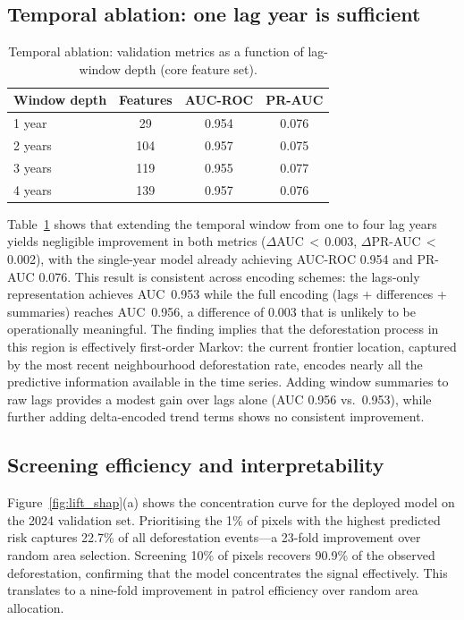 \documentclass{iopart}
\begin{document}
\subsection{Temporal ablation: one lag year is sufficient}
\label{sec:results_temporal}

\begin{table}[htbp]
\begin{center}
\caption{\label{tab:temporal}
Temporal ablation: validation metrics as a function of
lag-window depth (core feature set).}
\begin{tabular}{lccc}
\toprule
Window depth & Features & AUC-ROC & PR-AUC \\
\midrule
1 year  &  29 & 0.954 & 0.076 \\
2 years & 104 & 0.957 & 0.075 \\
3 years & 119 & 0.955 & 0.077 \\
4 years & 139 & 0.957 & 0.076 \\
\bottomrule
\end{tabular}
\end{center}
\end{table}

Table~\ref{tab:temporal} shows that extending the temporal window
from one to four lag years yields negligible improvement in both
metrics ($\Delta$AUC\,$<$\,0.003, $\Delta$PR-AUC\,$<$\,0.002),
with the single-year model already achieving AUC-ROC 0.954 and
PR-AUC 0.076.
This result is consistent across encoding schemes: the lags-only
representation achieves AUC~0.953 while the full encoding
(lags + differences + summaries) reaches AUC~0.956, a difference
of 0.003 that is unlikely to be operationally meaningful.
The finding implies that the deforestation process in this region
is effectively first-order Markov: the current frontier location,
captured by the most recent neighbourhood deforestation rate, encodes
nearly all the predictive information available in the time series.
Adding window summaries to raw lags provides a modest gain over lags alone
(AUC 0.956 vs.\ 0.953), while further adding delta-encoded trend terms
shows no consistent improvement.

\subsection{Screening efficiency and interpretability}

Figure~\ref{fig:lift_shap}(a) shows the concentration curve for the
deployed model on the 2024 validation set.
Prioritising the 1\% of pixels with the highest predicted risk captures
22.7\% of all deforestation events---a 23-fold improvement over
random area selection.
Screening 10\% of pixels recovers 90.9\% of the observed deforestation,
confirming that the model concentrates the signal effectively.
This translates to a nine-fold improvement in patrol efficiency
over random area allocation.
\end{document}
